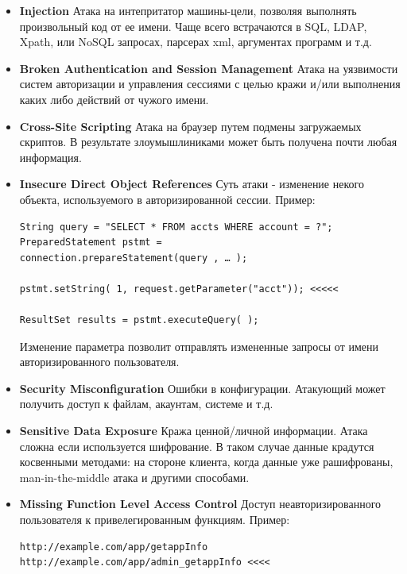 \documentclass[a4paper, 14pt]{article}				%
\begin{document}
\begin{itemize}
\item {\textbf{Injection} Атака на интепритатор машины-цели, позволяя выполнять произвольный код от ее имени. Чаще всего встрачаются в SQL, LDAP, Xpath, или NoSQL запросах, парсерах xml, аргументах программ и т.д.}

\item {\textbf{Broken Authentication and Session Management} Атака на уязвимости систем авторизации и управления сессиями с целью кражи и/или выполнения каких либо действий от чужого имени.}

\item {\textbf{Cross-Site Scripting} Атака на браузер путем подмены загружаемых скриптов. В результате злоумышлиниками может быть получена почти любая информация.}

\item {\textbf{Insecure Direct Object References} Суть атаки - изменение некого объекта, используемого в авторизированной сессии. Пример: 
\begin{Verbatim}[frame=single]
String query = "SELECT * FROM accts WHERE account = ?";
PreparedStatement pstmt = 
connection.prepareStatement(query , … );

pstmt.setString( 1, request.getParameter("acct")); <<<<<

ResultSet results = pstmt.executeQuery( );
\end{Verbatim}

Изменение параметра позволит отправлять измененные запросы от имени авторизированного пользователя.}

\item {\textbf{Security Misconfiguration} Ошибки в конфигурации. Атакующий может получить доступ к файлам, акаунтам, системе и т.д.}

\item {\textbf{Sensitive Data Exposure} Кража ценной/личной информации. Атака сложна если используется шифрование. В таком случае данные крадутся косвенными методами: на стороне клиента, когда данные уже рашифрованы, man-in-the-middle атака и другими способами.}

\item {\textbf{Missing Function Level Access Control} Доступ неавторизированного пользователя к привелегированным функциям. 
Пример: 

\begin{Verbatim}[frame=single]
http://example.com/app/getappInfo
http://example.com/app/admin_getappInfo <<<<
\end{Verbatim}

}
\end{itemize}
\end{document}
